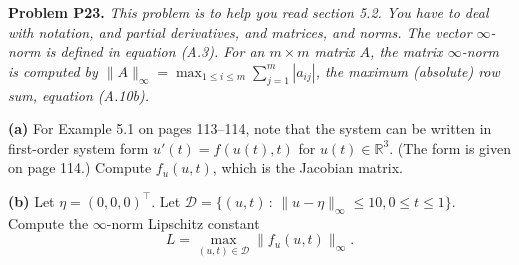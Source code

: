 \documentclass[12pt]{amsart}
\newcommand{\RR}{\mathbb{R}}
\newcommand{\prob}[1]{\bigskip\noindent\textbf{#1}\quad }
\newcommand{\epart}[1]{\medskip\noindent\textbf{(#1)}\quad }
\begin{document}
\prob{Problem P23.}  \emph{This problem is to help you read section 5.2.  You have to deal with notation, and partial derivatives, and matrices, and norms.  The vector $\infty$-norm is defined in equation (A.3).  For an $m\times m$ matrix $A$, the matrix $\infty$-norm is computed by $\|A\|_\infty = \max_{1\le i\le m} \sum_{j=1}^m |a_{ij}|$,
the maximum (absolute) row sum, equation (A.10b).}

\epart{a} For Example 5.1 on pages 113--114, note that the system can be written in first-order system form $u'(t) = f(u(t),t)$ for $u(t) \in \RR^3$.  (The form is given on page 114.)  Compute $f_u(u,t)$, which is the Jacobian matrix. 

\epart{b}  Let $\eta = (0,0,0)^\top$.  Let $\mathcal{D} = \{(u,t)\,:\,\|u - \eta\|_\infty \le 10, 0 \le t \le 1\}$.  Compute the $\infty$-norm Lipschitz constant
	$$L = \max_{(u,t)\in\mathcal{D}} \|f_u(u,t)\|_\infty.$$
\end{document}
